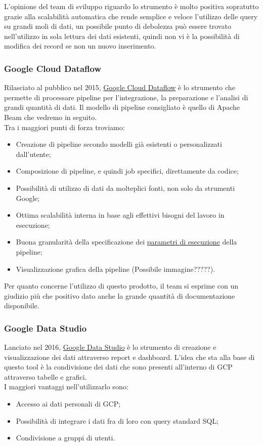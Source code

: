 L'opinione del team di sviluppo riguardo lo strumento è molto positiva sopratutto grazie alla scalabilità automatica che rende semplice e veloce l'utilizzo delle query su grandi moli di dati, un possibile punto di debolezza può essere trovato nell'utilizzo in sola lettura dei dati esistenti, quindi non vi è la possibilità di modifica dei record se non un nuovo inserimento.
\subsubsection{Google Cloud Dataflow}
Rilasciato al pubblico nel 2015, \href{https://cloud.google.com/dataflow/}{Google Cloud Dataflow} è lo strumento che permette di processare pipeline per l'integrazione, la preparazione e l'analisi di grandi quantità di dati.
Il modello di pipeline consigliato è quello di Apache Beam che vedremo in seguito.
\\ Tra i maggiori punti di forza troviamo:
\begin{itemize}
	\item Creazione di pipeline secondo modelli già esistenti o personalizzati dall'utente;
	\item Composizione di pipeline, e quindi job specifici, direttamente da codice;
	\item Possibilità di utilizzo di dati da molteplici fonti, non solo da strumenti Google;
	\item Ottima scalabilità interna in base agli effettivi bisogni del lavoro in esecuzione;
	\item Buona granularità della specificazione dei \href{https://cloud.google.com/dataflow/docs/guides/specifying-exec-params?authuser=2\&hl=it}{parametri di esecuzione} della pipeline;
	\item Visualizzazione grafica della pipeline (Possibile immagine?????). 
\end{itemize}
Per quanto concerne l'utilizzo di questo prodotto, il team si esprime con un giudizio più che positivo dato anche la grande quantità di documentazione disponibile.
\subsubsection{Google Data Studio}
Lanciato nel 2016, \href{https://datastudio.google.com/overview}{Google Data Studio} è lo strumento di creazione e visualizzazione dei dati attraverso report e dashboard. L'idea che sta alla base di questo tool è la condivisione dei dati che sono presenti all'interno di GCP attraverso tabelle e grafici.
\\ I maggiori vantaggi nell'utilizzarlo sono:
\begin{itemize}
	\item Accesso ai dati personali di GCP;
	\item Possibilità di integrare i dati fra di loro con query standard SQL;
	\item Condivisione a gruppi di utenti. 
\end{itemize}


